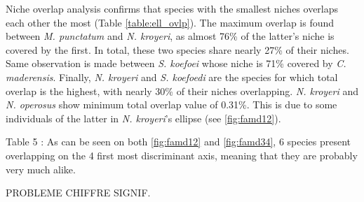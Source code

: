 Niche overlap analysis confirms that species with the smallest niches overlaps each other the most (Table \ref{table:ell_ovlp}). The maximum overlap is found between \textit{M. punctatum} and \textit{N. kroyeri}, as almost 76\% of the latter's niche is covered by the first. In total, these two species share nearly 27\% of their niches. Same observation is made between \textit{S. koefoei} whose niche is 71\% covered by \textit{C. maderensis}. Finally, \textit{N. kroyeri} and \textit{S. koefoedi} are the species for which total overlap is the highest, with nearly 30\% of their niches overlapping.
\textit{N. kroyeri} and \textit{N. operosus} show minimum total overlap value of 0.31\%. This is due to some individuals of the latter in \textit{N. kroyeri}'s ellipse (see \ref{fig:famd12}). 

Table 5 : As can be seen on both \ref{fig:famd12} and \ref{fig:famd34}, 6 species present overlapping on the 4 first most discriminant axis, meaning that they are probably very much alike. 


PROBLEME CHIFFRE SIGNIF.

